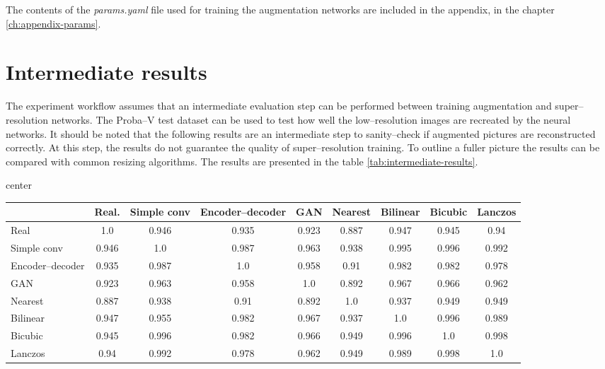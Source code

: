 The contents of the \textit{params.yaml} file used for training the augmentation networks are included in the appendix, in the chapter \ref{ch:appendix-params}.

\section{Intermediate results}
The experiment workflow assumes that an intermediate evaluation step can be performed between training augmentation and super--resolution networks.
The Proba--V test dataset can be used to test how well the low--resolution images are recreated by the neural networks.
It should be noted that the following results are an intermediate step to sanity--check if augmented pictures are reconstructed correctly.
At this step, the results do not guarantee the quality of super--resolution training. 
To outline a fuller picture the results can be compared with common resizing algorithms.
The results are presented in the table \ref{tab:intermediate-results}.
\begin{sidewaystable}
\centering
\caption{Intermediate results of evaluation on Proba--V test dataset (SSIM metric)}
\label{tab:intermediate-results}
\begin{adjustbox}{center}
\begin{tabular}{lcccccccc}
\toprule
                 & Real.       & Simple conv & Encoder--decoder & GAN & Nearest & Bilinear & Bicubic & Lanczos \\
\midrule
Real             &      1.0       &    0.946     & 0.935 &   0.923     &   0.887       & 0.947 & 0.945 & 0.94 \\
Simple conv      & 0.946 & 1.0 &   0.987  &  0.963  & 0.938 & 0.995 & 0.996 & 0.992 \\
Encoder--decoder & 0.935 & 0.987 &  1.0   &     0.958  & 0.91 & 0.982 & 0.982 & 0.978  \\
GAN              &   0.923          &  0.963             &   0.958  & 1.0 & 0.892 &     0.967    & 0.966 & 0.962 \\
Nearest          & 0.887 & 0.938 &   0.91  & 0.892 & 1.0 & 0.937 & 0.949 & 0.949 \\
Bilinear         & 0.947 & 0.955 &    0.982 & 0.967 & 0.937 & 1.0 & 0.996    &  0.989 \\
Bicubic          & 0.945 & 0.996 &  0.982   & 0.966 & 0.949 & 0.996 &   1.0  & 0.998 \\
Lanczos          & 0.94& 0.992 &    0.978 & 0.962 & 0.949 & 0.989       & 0.998 & 1.0 \\
\bottomrule        
\end{tabular}
\end{adjustbox}
\end{sidewaystable}
